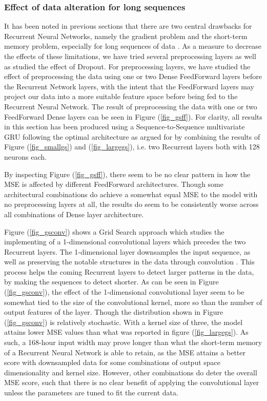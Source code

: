 \documentclass
[twocolumn,
secnumarabic,
nobibnotes,
aps,
prl,
reprint,
groupedaddress,
amsmath,
amssymb,
]{revtex4-2}
\begin{document}
\subsubsection{Effect of data alteration for long sequences}
It has been noted in previous sections that there are two central drawbacks for Recurrent Neural Networks, namely the gradient problem and the short-term memory problem, especially for long sequences of data \cite{Geron2019}. As a measure to decrease the effects of these limitations, we have tried several preprocessing layers as well as studied the effect of Dropout. For preprocessing layers, we have studied the effect of preprocessing the data using one or two Dense FeedForward layers before the Recurrent Network layers, with the intent that the FeedForward layers may project our data into a more suitable feature space before being fed to the Recurrent Neural Network. The result of preprocessing the data with one or two FeedForward Dense layers can be seen in Figure (\ref{fig_gsff}). For clarity, all results in this section has been produced using a Sequence-to-Sequence multivariate GRU following the optimal architecture as argued for by combining the results of Figure (\ref{fig_smallgs}) and (\ref{fig_largegs}), i.e. two Recurrent layers both with 128 neurons each.

By inspecting Figure (\ref{fig_gsff}), there seem to be no clear pattern in how the MSE is affected by different FeedForward architectures. Though some architectural combinations do achieve a somewhat equal MSE to the model with no preprocessing layers at all, the results do seem to be consistently worse across all combinations of Dense layer architecture.  

Figure (\ref{fig_gsconv}) shows a Grid Search approach which studies the implementing of a 1-dimensional convolutional layers which precedes the two Recurrent layers. The 1-dimensional layer downsamples the input sequence, as well as preserving the notable structures in the data through convolution \cite{Geron2019}. This process helps the coming Recurrent layers to detect larger patterns in the data, by making the sequences to detect shorter. As can be seen in Figure (\ref{fig_gsconv}), the effect of the 1-dimensional convolutional layer seem to be somewhat tied to the size of the convolutional kernel, more so than the number of output features of the layer. Though the distribution shown in Figure (\ref{fig_gsconv}) is relatively stochastic. With a kernel size of three, the model attains lower MSE values than what was reported in figure (\ref{fig_largegs}). As such, a 168-hour input width may prove longer than what the short-term memory of a Recurrent Neural Network is able to retain, as the MSE attains a better score with downsampled data for some combinations of output space dimensionality and kernel size. However, other combinations do deter the overall MSE score, such that there is no clear benefit of applying the convolutional layer unless the parameters are tuned to fit the current data.
\end{document}
